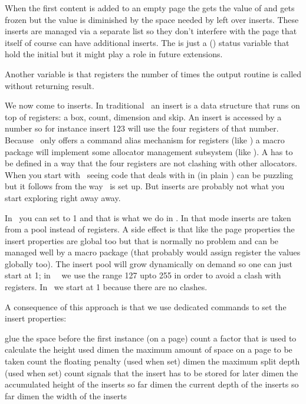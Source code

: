 When the first content is added to an empty page the \type {\pagegoal} gets the
value of \type {\vsize} and gets frozen but the value is diminished by the space
needed by left over inserts. These inserts are managed via a separate list so
they don't interfere with the page that itself of course can have additional
inserts. The \type {\pagevsize} is just a (\LUAMETATEX) status variable that hold
the initial \type {\pagegoal} but it might play a role in future extensions.

Another variable is \type {\deadcycles} that registers the number of times the
output routine is called without returning result.

\stopsectionlevel

\startsectionlevel[title=Inserts]

We now come to inserts. In traditional \TEX\ an insert is a data structure that
runs on top of registers: a box, count, dimension and skip. An insert is accessed
by a number so for instance insert 123 will use the four registers of that
number. Because \TEX\ only offers a command alias mechanism for registers (like
\type {\countdef}) a macro package will implement some allocator management
subsystem (like \type {\newcount}). A \type {\newinsert} has to be defined in a
way that the four registers are not clashing with other allocators. When you
start with \TEX\ seeing code that deals with in (in plain \TEX) can be puzzling
but it follows from the way \TEX\ is set up. But inserts are probably not what
you start exploring right away away.

In \LUAMETATEX\ you can set \type {\insertmode} to 1 and that is what we do in
\CONTEXT. In that mode inserts are taken from a pool instead of registers. A side
effect is that like the page properties the insert properties are global too but
that is normally no problem and can be managed well by a macro package (that
probably would assign register the values globally too). The insert pool will
grow dynamically on demand so one can just start at 1; in \CONTEXT\ \MKIV\ we use
the range 127 upto 255 in order to avoid a clash with registers. In \LMTX\ we start
at 1 because there are no clashes.

A consequence of this approach is that we use dedicated commands to set the insert
properties:

\starttabulate[|l|l|p|]
\NC \type {\insertdistance}   \NC glue  \NC the space before the first instance (on a page) \NC \NR
\NC \type {\insertmultiplier} \NC count \NC a factor that is used to calculate the height used \NC \NR
\NC \type {\insertlimit}      \NC dimen \NC the maximum amount of space on a page to be taken \NC \NR
\NC \type {\insertpenalty}    \NC count \NC the floating penalty (used when set) \NC \NR
\NC \type {\insertmaxdepth}   \NC dimen \NC the maximum split depth (used when set) \NC \NR
\NC \type {\insertstorage}    \NC count \NC signals that the insert has to be stored for later \NC \NR
\NC \type {\insertheight}     \NC dimen \NC the accumulated height of the inserts so far \NC \NR
\NC \type {\insertdepth}      \NC dimen \NC the current depth of the inserts so far \NC \NR
\NC \type {\insertwidth}      \NC dimen \NC the width of the inserts \NC \NR
\stoptabulate

